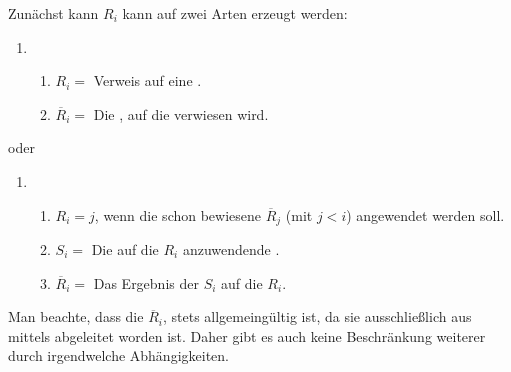{\begin{enumerate}
	Zunächst kann $R_i$ kann auf zwei Arten erzeugt werden:
	\begin{enumerate}
		\setcounter{enumii}{\value{Enumii}}%
		\item
		\begin{enumerate}
			\item $R_i =$ Verweis auf eine .
			\item $\overline{R}_i =$ Die , auf die verwiesen wird.
		\end{enumerate}
		\setcounter{Enumii}{\value{enumii}}%
	\end{enumerate}
	oder
	\begin{enumerate}
		\item
		\begin{enumerate}
			\item $R_i = j$, wenn die schon bewiesene  $\overline{R}_j$ (mit $j < i$) angewendet werden soll.
			\item $S_i =$ Die auf die  $R_i$ anzuwendende .
			\item $\overline{R}_i =$ Das Ergebnis der  $S_i$ auf die  $R_i$.
		\end{enumerate}
		\setcounter{Enumii}{\value{enumii}}%
	\end{enumerate}
	Man beachte, dass die  $\overline{R}_i$, stets allgemeingültig ist, da sie ausschließlich aus  mittels  abgeleitet worden ist.
	Daher gibt es auch keine Beschränkung weiterer  durch irgendwelche Abhängigkeiten.


\end{enumerate}}
